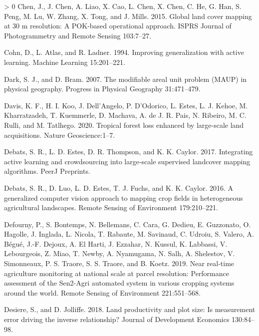 \documentclass[11pt,a4paper]{article}
\newlength{\cslhangindent}
\newenvironment{CSLReferences}[3] %
 {%
  \setlength{\parindent}{0pt}
  \ifodd #1 \everypar{\setlength{\hangindent}{\cslhangindent}}\ignorespaces\fi
  \ifnum #2 > 0
  \setlength{\parskip}{#2\baselineskip}
  \fi
 }%
 {}
\begin{document}
\begin{CSLReferences}{1}{0}
\leavevmode\hypertarget{ref-ChenGloballandcover2015}{}%
Chen, J., J. Chen, A. Liao, X. Cao, L. Chen, X. Chen, C. He, G. Han, S.
Peng, M. Lu, W. Zhang, X. Tong, and J. Mills. 2015. Global land cover
mapping at 30 m resolution: A {POK}-based operational approach. ISPRS
Journal of Photogrammetry and Remote Sensing 103:7--27.

\leavevmode\hypertarget{ref-cohnImprovingGeneralizationActive1994}{}%
Cohn, D., L. Atlas, and R. Ladner. 1994. Improving generalization with
active learning. Machine Learning 15:201--221.

\leavevmode\hypertarget{ref-Darkmodifiablearealunit2007}{}%
Dark, S. J., and D. Bram. 2007. The modifiable areal unit problem
({MAUP}) in physical geography. Progress in Physical Geography
31:471--479.

\leavevmode\hypertarget{ref-davisTropicalForestLoss2020}{}%
Davis, K. F., H. I. Koo, J. Dell'Angelo, P. D'Odorico, L. Estes, L. J.
Kehoe, M. Kharratzadeh, T. Kuemmerle, D. Machava, A. de J. R. Pais, N.
Ribeiro, M. C. Rulli, and M. Tatlhego. 2020. Tropical forest loss
enhanced by large-scale land acquisitions. Nature Geoscience:1--7.

\leavevmode\hypertarget{ref-DebatsIntegratingactivelearning2017}{}%
Debats, S. R., L. D. Estes, D. R. Thompson, and K. K. Caylor. 2017.
Integrating active learning and crowdsourcing into large-scale
supervised landcover mapping algorithms. {PeerJ Preprints}.

\leavevmode\hypertarget{ref-Debatsgeneralizedcomputervision2016}{}%
Debats, S. R., D. Luo, L. D. Estes, T. J. Fuchs, and K. K. Caylor. 2016.
A generalized computer vision approach to mapping crop fields in
heterogeneous agricultural landscapes. Remote Sensing of Environment
179:210--221.

\leavevmode\hypertarget{ref-Defournyrealtimeagriculturemonitoring2019}{}%
Defourny, P., S. Bontemps, N. Bellemans, C. Cara, G. Dedieu, E.
Guzzonato, O. Hagolle, J. Inglada, L. Nicola, T. Rabaute, M. Savinaud,
C. Udroiu, S. Valero, A. Bégué, J.-F. Dejoux, A. El Harti, J. Ezzahar,
N. Kussul, K. Labbassi, V. Lebourgeois, Z. Miao, T. Newby, A. Nyamugama,
N. Salh, A. Shelestov, V. Simonneaux, P. S. Traore, S. S. Traore, and B.
Koetz. 2019. Near real-time agriculture monitoring at national scale at
parcel resolution: Performance assessment of the {Sen2}-{Agri} automated
system in various cropping systems around the world. Remote Sensing of
Environment 221:551--568.

\leavevmode\hypertarget{ref-desiereLandProductivityPlot2018}{}%
Desiere, S., and D. Jolliffe. 2018. Land productivity and plot size: Is
measurement error driving the inverse relationship? Journal of
Development Economics 130:84--98.


\end{CSLReferences}
\end{document}

